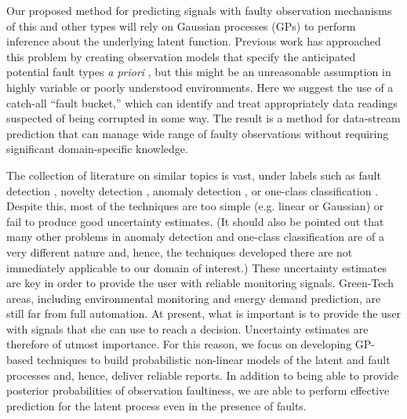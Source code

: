 \documentclass{article}
\newcommand{\psff}[1]{\texttt{[image: \#1.eps]}}
\begin{document}

Our proposed method for predicting signals with faulty observation
mechanisms of this and other types will rely on Gaussian processes (GPs) to
perform inference about the underlying latent function.  Previous work
has approached this problem by creating observation models that
specify the anticipated potential fault types \textit{a priori}
\cite{garnettosborne}, but this might be an unreasonable assumption
in highly variable or poorly understood environments.  Here we suggest
the use of a catch-all ``fault bucket,'' which can identify and treat appropriately
data readings suspected of being corrupted in some way.  The
result is a method for data-stream prediction that can manage wide range of faulty observations without requiring significant domain-specific knowledge.

The collection of literature on similar topics is vast, under labels such as fault detection \cite{deFreitas1996, Eciolaza2001, Isermann2005, Ding2008}, novelty detection \cite{Markou2003}, anomaly detection \cite{Chandola:2009}, or one-class classification \cite{Khan2010}. Despite this, most of the techniques are too simple (e.g. linear or Gaussian) or fail to produce good uncertainty estimates. (It should also be pointed out that many other problems in anomaly detection and one-class classification are of a very different nature and, hence, the techniques developed there are not immediately applicable to our domain of interest.) These uncertainty estimates are key in order to provide the user with reliable monitoring signals. Green-Tech areas, including environmental monitoring and energy demand prediction, are still far from full automation. At present, what is important is to provide the user with signals that she can use to reach a decision. Uncertainty estimates are therefore of utmost importance. For this reason, we focus on developing GP-based techniques to build probabilistic non-linear models of the latent and fault processes and, hence, deliver reliable reports.  In addition to being able to provide posterior probabilities of observation faultiness, we are  able to perform effective prediction for the latent process even in the presence of faults.
\end{document}
